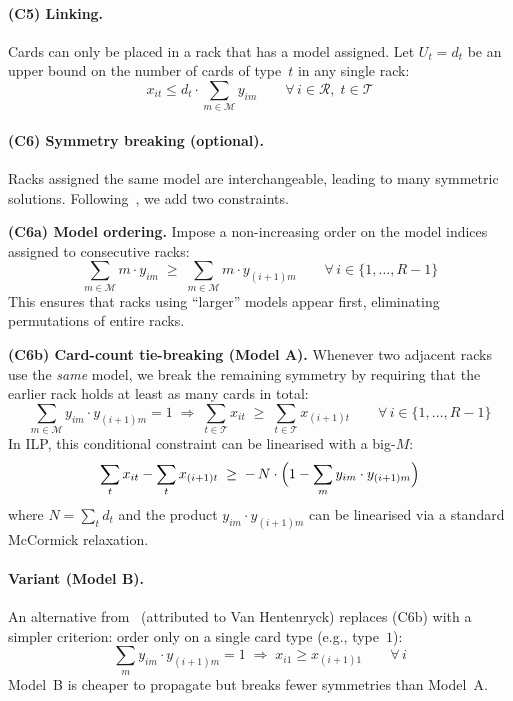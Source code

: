 \documentclass[11pt,a4paper]{article}
\newcommand{\setR}{\mathcal{R}}
\newcommand{\setM}{\mathcal{M}}
\newcommand{\setT}{\mathcal{T}}
\begin{document}
\paragraph{(C5) Linking.}
Cards can only be placed in a rack that has a model assigned.
Let $U_t = d_t$ be an upper bound on the number of cards of type~$t$
in any single rack:
\begin{equation}\label{eq:ilp-link}
  x_{it} \le d_t \cdot \sum_{m \in \setM} y_{im}
  \qquad \forall\, i \in \setR,\; t \in \setT
\end{equation}

\paragraph{(C6) Symmetry breaking (optional).}
Racks assigned the same model are interchangeable, leading
to many symmetric solutions.
Following~\cite{Kiziltan01symmetrybreaking}, we add two constraints.

\medskip\noindent
\textbf{(C6a) Model ordering.}
Impose a non-increasing order on the model indices assigned
to consecutive racks:
\begin{equation}\label{eq:ilp-sym-a}
  \sum_{m \in \setM} m \cdot y_{im}
  \;\ge\;
  \sum_{m \in \setM} m \cdot y_{(i+1)m}
  \qquad \forall\, i \in \{1, \dots, R-1\}
\end{equation}
This ensures that racks using ``larger'' models appear first,
eliminating permutations of entire racks.

\medskip\noindent
\textbf{(C6b) Card-count tie-breaking (Model A).}
Whenever two adjacent racks use the \emph{same} model,
we break the remaining symmetry by requiring that the
earlier rack holds at least as many cards in total:
\begin{equation}\label{eq:ilp-sym-b}
  \sum_{m \in \setM} y_{im} \cdot y_{(i+1)m}
  = 1
  \;\Longrightarrow\;
  \sum_{t \in \setT} x_{it}
  \;\ge\;
  \sum_{t \in \setT} x_{(i+1)t}
  \qquad \forall\, i \in \{1, \dots, R-1\}
\end{equation}
In ILP, this conditional constraint can be linearised with a big-$M$:
\[
  \sum_{t} x_{it} - \sum_{t} x_{(i+1)t}
  \;\ge\;
  -\,N \cdot \Bigl(1 - \sum_{m} y_{im} \cdot y_{(i+1)m}\Bigr)
\]
where $N = \sum_t d_t$ and the product $y_{im} \cdot y_{(i+1)m}$
can be linearised via a standard McCormick relaxation.

\paragraph{Variant (Model B).}
An alternative from~\cite{Kiziltan01symmetrybreaking}
(attributed to Van Hentenryck) replaces (C6b) with a simpler
criterion: order only on a single card type
(e.g., type~$1$):
\begin{equation}\label{eq:ilp-sym-b-alt}
  \sum_{m} y_{im} \cdot y_{(i+1)m} = 1
  \;\Longrightarrow\;
  x_{i1} \ge x_{(i+1)1}
  \qquad \forall\, i
\end{equation}
Model~B is cheaper to propagate but breaks fewer symmetries
than Model~A.
\end{document}

